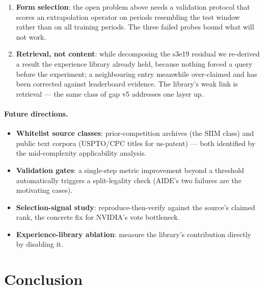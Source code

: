 \documentclass[11pt,a4paper]{article}
\begin{document}
\begin{enumerate}[leftmargin=*]
  \item \textbf{Form selection}: the open problem above needs a validation protocol that scores an extrapolation operator on periods resembling the test window rather than on all training periods. The three failed probes bound what will not work.
  \item \textbf{Retrieval, not content}: while decomposing the s3e19 residual we re-derived a result the experience library already held, because nothing forced a query before the experiment; a neighbouring entry meanwhile over-claimed and has been corrected against leaderboard evidence. The library's weak link is retrieval --- the same class of gap v5 addresses one layer up.
\end{enumerate}

\paragraph{Future directions.}
\begin{itemize}[leftmargin=*]
  \item \textbf{Whitelist source classes}: prior-competition archives (the SIIM class) and public text corpora (USPTO/CPC titles for us-patent) --- both identified by the mid-complexity applicability analysis.
  \item \textbf{Validation gates}: a single-step metric improvement beyond a threshold automatically triggers a split-legality check (AIDE's two failures are the motivating cases).
  \item \textbf{Selection-signal study}: reproduce-then-verify against the source's claimed rank, the concrete fix for NVIDIA's vote bottleneck.
  \item \textbf{Experience-library ablation}: measure the library's contribution directly by disabling it.
\end{itemize}

\section{Conclusion}
\end{document}
